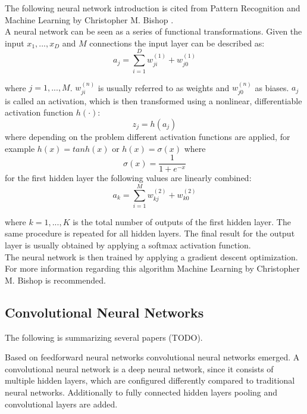 \documentclass[draft,final,oneside]{vutinfth} %
\begin{document}
The following neural network introduction is cited from Pattern Recognition and Machine Learning by Christopher M. Bishop \cite{bishop}. \\ 

A neural network can be seen as a series of functional transformations. Given the input $x_1, ..., x_D$ and $M$ connections the input layer can be described as:
\begin{equation}
a_j = \sum_{i=1}^{D} w_{ji}^{(1)} + w_{j0}^{(1)}
\end{equation}

where $j = 1, ..., M$. $w_{ji}^{(n)}$ is usually referred to as weights and $w_{j0}^{(n)}$ as biases. $a_j$ is called an activation, which is then transformed using a nonlinear, differentiable activation function $h(\cdot)$:
\begin{equation}
z_j = h(a_j)
\end{equation}
where depending on the problem different activation functions are applied, for example $h(x) = tanh(x)$ or $h(x) = \sigma(x)$ where
\begin{equation}
\sigma(x) = \dfrac {1} {1 + e^{-x}}
\end{equation}
for the first hidden layer the following values are linearly combined:
\begin{equation}
a_k = \sum_{i=1}^{M} w_{kj}^{(2)} + w_{k0}^{(2)}
\end{equation}

where $k = 1, ..., K$ is the total number of outputs of the first hidden layer. The same procedure is repeated for all hidden layers. The final result for the output layer is usually obtained by applying a softmax activation function. \\

The neural network is then trained by applying a gradient descent optimization. For more information regarding this algorithm Machine Learning by Christopher M. Bishop \cite{bishop} is recommended. 

\subsection{Convolutional Neural Networks}
The following is summarizing several papers (TODO).

Based on feedforward neural networks convolutional neural networks emerged. A convolutional neural network is a deep neural network, since it consists of multiple hidden layers, which are configured differently compared to traditional neural networks. Additionally to fully connected hidden layers pooling and convolutional layers are added. \\
\end{document}
